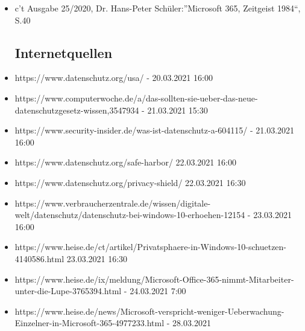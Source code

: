 \begin{itemize}
    \item c’t Ausgabe 25/2020, Dr. Hans-Peter Schüler:”Microsoft 365, Zeitgeist 1984“, S.40
    \subsection{Internetquellen}
    \item https://www.datenschutz.org/usa/ - 20.03.2021 16:00
    \item https://www.computerwoche.de/a/das-sollten-sie-ueber-das-neue-datenschutzgesetz-wissen,3547934 - 21.03.2021 15:30
    \item https://www.security-insider.de/was-ist-datenschutz-a-604115/ - 21.03.2021 16:00
    \item https://www.datenschutz.org/safe-harbor/ 22.03.2021 16:00
    \item https://www.datenschutz.org/privacy-shield/ 22.03.2021 16:30
    \item https://www.verbraucherzentrale.de/wissen/digitale-welt/datenschutz/datenschutz-bei-windows-10-erhoehen-12154 - 23.03.2021 16:00
    \item https://www.heise.de/ct/artikel/Privatsphaere-in-Windows-10-schuetzen-4140586.html 23.03.2021 16:30
    \item https://www.heise.de/ix/meldung/Microsoft-Office-365-nimmt-Mitarbeiter-unter-die-Lupe-3765394.html - 24.03.2021 7:00
    \item https://www.heise.de/news/Microsoft-verspricht-weniger-Ueberwachung-Einzelner-in-Microsoft-365-4977233.html - 28.03.2021
\end{itemize}